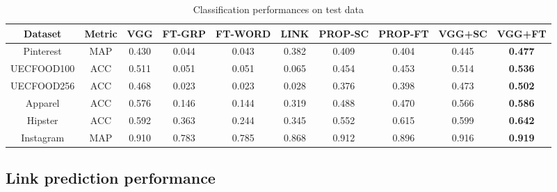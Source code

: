 \documentclass[letterpaper]{article} %
\begin{document}

\begin{table*}[t]
  \caption{Classification performances on test data}
  \label{table:classify}
  \begin{center}
    \begin{tabular}{|c|c|c|c|c|c||c|c|c|c|}\hline
      Dataset    & Metric & VGG   & FT-GRP & FT-WORD & LINK  & PROP-SC & PROP-FT & VGG+SC & VGG+FT \\ \hline
	  Pinterest  & MAP    & 0.430 & 0.044  & 0.043   & 0.382 & 0.409   & 0.404   & 0.445  & {\bf 0.477}  \\
      UECFOOD100 & ACC    & 0.511 & 0.051  & 0.051   & 0.065 & 0.454   & 0.453   & 0.514  & {\bf 0.536}  \\
      UECFOOD256 & ACC    & 0.468 & 0.023  & 0.023   & 0.028 & 0.376   & 0.398   & 0.473  & {\bf 0.502}  \\
      Apparel    & ACC    & 0.576 & 0.146  & 0.144   & 0.319 & 0.488   & 0.470   & 0.566  & {\bf 0.586}  \\
	  Hipster    & ACC    & 0.592 & 0.363  & 0.244   & 0.345 & 0.552   & 0.615   & 0.599  & {\bf 0.642}  \\
	  Instagram  & MAP    & 0.910 & 0.783  & 0.785   & 0.868 & 0.912   & 0.896   & 0.916  & {\bf 0.919}  \\ \hline
    \end{tabular}
  \end{center}
\end{table*}

\subsection{Link prediction performance}
\label{sec:exp:link}
\indent
\end{document}
